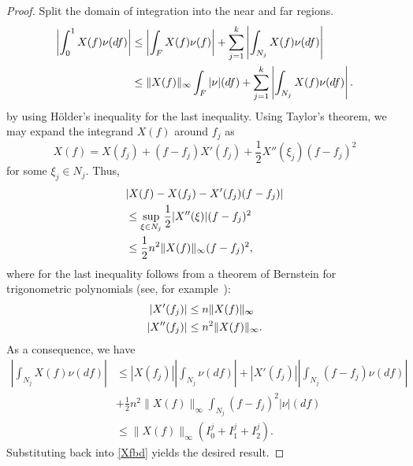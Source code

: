 \begin{proof}\label{apx:pf:taylor}
Split the domain of integration into the near and far regions.
\begin{align}
\left |\int_0^1 X(f) \nu(df)\right | 
&\leq \left |\int_F X(f) \nu (f)\right | + \sum_{j=1}^k \left | \int_{N_j}X(f) \nu(df)\right |\nonumber \\
&\leq \lVert X(f)\rVert_\infty \int_F |\nu| (df) + \sum_{j=1}^k \left | \int_{N_j}X(f) \nu(df) \right |.\label{Xfbd}
\end{align}
by using H\"{o}lder's inequality for the last inequality. Using Taylor's theorem, we may expand the integrand $X(f)$ around $f_j$ as
\[
X(f) = X(f_j) + (f-f_j) X'(f_j) + \frac{1}{2} X''(\xi_j) (f-f_j)^2 
\]
for some $\xi_j \in N_j$. 
Thus,
{\small
\begin{align*}
&|X(f)-X(f_j)-X'(f_j)(f-f_j)|\\
&\leq \sup_{\xi \in N_j} \frac{1}{2}|X''(\xi)|(f -f_j)^2\\ &\leq \frac{1}{2} n^2 \lVert X(f)\rVert_\infty(f - f_j)^2, 
\end{align*}
}
where for the last inequality follows from a theorem of Bernstein for trigonometric polynomials (see, for example~\cite{bernstein}):  
\begin{align*}
|X'(f_j)|  & \leq n \lVert X(f)\rVert_\infty\\
|X''(f_j)| & \leq n^2 \lVert X(f)\rVert_\infty.
\end{align*}
As a consequence, we have
\begin{align*}
\left | \int_{N_j} X(f) \nu(df)\right| &\leq \left| X(f_j)\right| \left| \int_{N_j} \nu (df)\right| + \left|X'(f_j)\right| \left|\int_{N_j} (f-f_j) \nu (df)  \right|\\
& + \frac{1}{2} n^2 \|X(f)\|_\infty \int_{N_j} (f-f_j)^2 |\nu| (df) \\
& \leq \|X(f)\|_\infty \left(I_0^j + I_1^j + I_2^j\right).
\end{align*}
Substituting back into \eqref{Xfbd} yields the desired result.
\end{proof}


